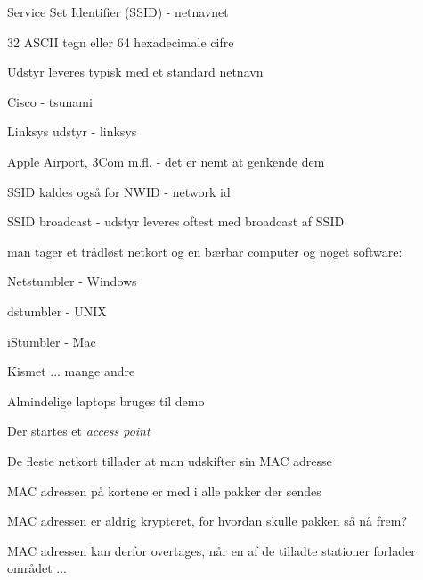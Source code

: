 \documentclass[Screen16to9,17pt]{foils}
\begin{document}
\begin{list1}
\item Service Set Identifier (SSID) - netnavnet
\item 32 ASCII tegn eller 64 hexadecimale cifre
\item Udstyr leveres typisk med et standard netnavn
\begin{list2}
\item Cisco - tsunami
\item Linksys udstyr - linksys
\item Apple Airport, 3Com m.fl. - det er nemt at genkende dem
\end{list2}
\item SSID kaldes også for NWID - network id
\item SSID broadcast - udstyr leveres oftest med broadcast af SSID
\end{list1}




\begin{list1}
\item man tager et trådløst netkort og en bærbar computer og noget software:
\begin{list2}
\item Netstumbler - Windows 
\item dstumbler - UNIX 
\item iStumbler - Mac 
\item Kismet ... mange andre
  \end{list2}
\end{list1}



\begin{list2}
\item Almindelige laptops bruges til demo
\item Der startes et \emph{access point}
\end{list2}


\begin{list1}
\item De fleste netkort tillader at man udskifter sin MAC adresse
\item MAC adressen på kortene er med i alle pakker der sendes
\item MAC adressen er aldrig krypteret, for hvordan skulle pakken så
  nå frem?
\item MAC adressen kan derfor overtages, når en af de tilladte
  stationer forlader området ...
\end{list1}
\end{document}
